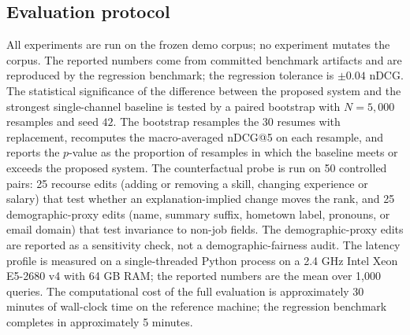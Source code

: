 \subsection{Evaluation protocol}\label{sec:4.4}
All experiments are run on the frozen demo corpus; no experiment mutates the corpus.
The reported numbers come from committed benchmark artifacts and are reproduced by the regression benchmark; the regression tolerance is $\pm 0.04$ nDCG.
The statistical significance of the difference between the proposed system and the strongest single-channel baseline is tested by a paired bootstrap with $N = 5{,}000$ resamples and seed $42$.
The bootstrap resamples the 30 resumes with replacement, recomputes the macro-averaged nDCG@5 on each resample, and reports the $p$-value as the proportion of resamples in which the baseline meets or exceeds the proposed system.
The counterfactual probe is run on 50 controlled pairs: 25 recourse edits (adding or removing a skill, changing experience or salary) that test whether an explanation-implied change moves the rank, and 25 demographic-proxy edits (name, summary suffix, hometown label, pronouns, or email domain) that test invariance to non-job fields. The demographic-proxy edits are reported as a sensitivity check, not a demographic-fairness audit.
The latency profile is measured on a single-threaded Python process on a 2.4 GHz Intel Xeon E5-2680 v4 with 64 GB RAM; the reported numbers are the mean over 1{,}000 queries.
The computational cost of the full evaluation is approximately 30 minutes of wall-clock time on the reference machine; the regression benchmark completes in approximately 5 minutes.
